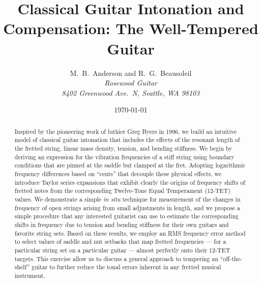 \documentclass[12pt]{article}
\title{{\Huge\textbf{Classical Guitar Intonation and Compensation: The Well-Tempered Guitar}}}
\author{ M.\ B.\ Anderson and R.\ G.\ Beausoleil \\
 \textit{Rosewood Guitar} \\
 \textit{8402 Greenwood Ave.\ N, Seattle, WA  98103}}
\date{\today}
\begin{document}
 \maketitle

 \begin{abstract}
Inspired by the pioneering work of luthier Greg Byers in 1996, we build an intuitive model of classical guitar intonation that includes the effects of the resonant length of the fretted string, linear mass density, tension, and bending stiffness. We begin by deriving an expression for the vibration frequencies of a stiff string using boundary conditions that are pinned at the saddle but clamped at the fret. Adopting logarithmic frequency differences based on ``cents'' that decouple these physical effects, we introduce Taylor series expansions that exhibit clearly the origins of frequency shifts of fretted notes from the corresponding Twelve-Tone Equal Temperament (12-TET) values. We demonstrate a simple \emph{in situ} technique for measurement of the changes in frequency of open strings arising from small adjustments in length, and we propose a simple procedure that any interested guitarist can use to estimate the corresponding shifts in frequency due to tension and bending stiffness for their own guitars and favorite string sets. Based on these results, we employ an RMS frequency error method to select values of saddle and nut setbacks that map fretted frequencies --- for a particular string set on a particular guitar --- almost perfectly onto their 12-TET targets. This exercise allow us to discuss a general approach to tempering an ``off-the-shelf'' guitar to further reduce the tonal errors inherent in any fretted musical instrument.
 \end{abstract}

 \tableofcontents

 
 
 
 
 
 

 \appendix
 
 
 
 


 
 

 
\end{document}

